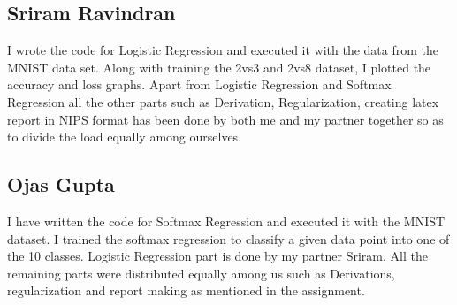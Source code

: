 \documentclass{article} %
\begin{document}
\subsection{Sriram Ravindran}
I wrote the code for Logistic Regression and executed it with the data from the MNIST data set. Along with training the 2vs3 and 2vs8 dataset, I plotted the accuracy and loss graphs. Apart from Logistic Regression and Softmax Regression all the other parts such as Derivation, Regularization, creating latex report in NIPS format has been done by both me and my partner together so as to divide the load equally among ourselves.\\

\subsection{Ojas Gupta}
I have written the code for Softmax Regression and executed it with the MNIST dataset. I trained the softmax regression to classify a given data point into one of the 10 classes. Logistic Regression part is done by my partner Sriram. All the remaining parts were distributed equally among us such as Derivations, regularization and report making as mentioned in the assignment.\\
\end{document}
